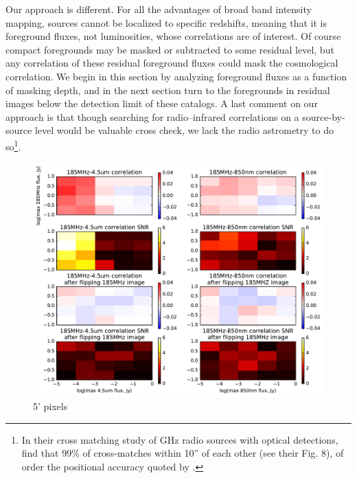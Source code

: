 \documentclass{emulateapj}
\begin{document}
Our approach is different. For all the advantages of broad band intensity mapping, sources cannot be localized to specific redshifts, meaning that it is foreground fluxes, not luminosities, whose correlations are of interest. Of course compact foregrounds may be masked or subtracted to some residual level, but any correlation of these residual foreground fluxes could mask the cosmological correlation. We begin in this section by analyzing foreground fluxes as a function of masking depth, and in the next section turn to the foregrounds in residual images below the detection limit of these catalogs. A last comment on our approach is that though searching for radio--infrared correlations on a source-by-source level would be valuable cross check, we lack the radio astrometry to do so\footnote{In their cross matching study of GHz radio sources with optical detections, \citep{mcmahon02} find that 99\% of cross-matches within 10'' of each other (see their Fig. 8), of order the positional accuracy quoted by \citet{PattiCatalog1}.}. 

\begin{figure}[h]
\centering
\includegraphics[width=5.5in]{images/source_correlation_grids_and_snrs.pdf}
\caption{5' pixels}
\label{fig:correlationsandSNRs}
\end{figure}
\end{document}
